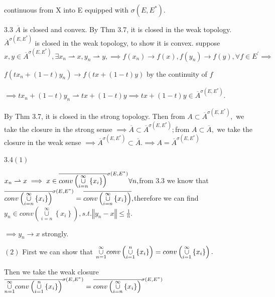 \documentclass{article}
\begin{document}
continuous from X into E equipped with $\sigma \left( E,E^{\ast }\right) .$

3.3 $\overline{A}$ is closed and convex. By Thm 3.7, it is closed in the
weak topology. $\overline{A}^{\sigma \left( E,E^{\ast }\right) }$ is closed
in the weak topology, to show it is convex. suppose $x,y\in \overline{A}%
^{\sigma \left( E,E^{\ast }\right) },\exists x_{n}\rightharpoonup
x,y_{n}\rightharpoonup y,\implies f\left( x_{n}\right) \rightarrow f\left(
x\right) ,f\left( y_{n}\right) \rightarrow f\left( y\right) ,\forall f\in
E^{\prime }\implies $

$f\left( tx_{n}+\left( 1-t\right) y_{n}\right) \rightarrow f\left( tx+\left(
1-t\right) y\right) $ by the continuity of $f$

$\implies tx_{n}+\left( 1-t\right) y_{n}\rightharpoonup tx+\left( 1-t\right)
y\implies tx+\left( 1-t\right) y\in \overline{A}^{\sigma \left( E,E^{\ast
}\right) }.$

By Thm 3.7, it is closed in the strong topology. Then from $A\subset 
\overline{A}^{\sigma \left( E,E^{\ast }\right) },$ we take the closure in
the strong sense $\implies \overline{A}\subset \overline{A}^{\sigma \left(
E,E^{\ast }\right) };$from $A\subset \overline{A},$ we take the closure in
the weak sense $\implies \overline{A}^{\sigma \left( E,E^{\ast }\right)
}\subset \overline{A}.\implies A=\overline{A}^{\sigma \left( E,E^{\ast
}\right) }$

3.4$\left( 1\right) $

\bigskip $x_{n}\rightharpoonup x\implies x\in \overline{conv\left( \underset{%
i=n}{\overset{\infty }{\cup }}\left\{ x_{i}\right\} \right) }^{\sigma \left(
E,E^{\ast }\right) }\forall n,$from 3.3 we know that $\overline{conv\left( 
\underset{i=n}{\overset{\infty }{\cup }}\left\{ x_{i}\right\} \right) }%
^{\sigma \left( E,E^{\ast }\right) }=\overline{conv\left( \underset{i=n}{%
\overset{\infty }{\cup }}\left\{ x_{i}\right\} \right) },$therefore we can
find $y_{n}\in conv\left( \underset{i=n}{\overset{\infty }{\cup }}\left\{
x_{i}\right\} \right) ,s.t.\left\Vert y_{n}-x\right\Vert \leq \frac{1}{n}.$

$\implies y_{n}\rightarrow x$ strongly.

$\left( 2\right) $ First we can show that $\underset{n=1}{\overset{\infty }{%
\cup }}conv\left( \underset{i=1}{\overset{n}{\cup }}\left\{ x_{i}\right\}
\right) =conv\left( \underset{i=1}{\overset{\infty }{\cup }}\left\{
x_{i}\right\} \right) .$

Then we take the weak closure $\overline{\underset{n=1}{\overset{\infty }{%
\cup }}conv\left( \underset{i=1}{\overset{n}{\cup }}\left\{ x_{i}\right\}
\right) }^{\sigma \left( E,E^{\ast }\right) }=\overline{conv\left( \underset{%
i=n}{\overset{\infty }{\cup }}\left\{ x_{i}\right\} \right) }^{\sigma \left(
E,E^{\ast }\right) }$
\end{document}
